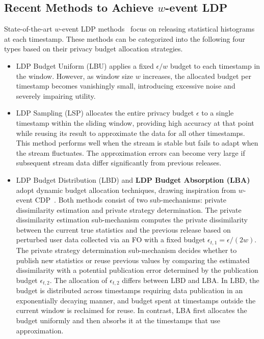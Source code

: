\subsection{\texorpdfstring{Recent Methods to Achieve $w$-event LDP}{Recent Methods to Achieve w-event LDP}}
\label{ss:competitors}

State-of-the-art $w$-event LDP methods~\cite{Ren2022} focus on releasing
statistical histograms at each timestamp.
These methods can be categorized into the following four types based on their
privacy budget allocation strategies.
\begin{itemize}
\item {LDP Budget Uniform (LBU)} applies a fixed $\epsilon/w$ budget to each
timestamp in the window.
However, as window size $w$ increases, the allocated budget per timestamp
becomes vanishingly small, introducing excessive noise and severely impairing
utility.

\item{LDP Sampling (LSP)} allocates the entire privacy budget $\epsilon$ to a
single timestamp within the sliding window, providing high accuracy at that
point while reusing its result to approximate the data for all other timestamps.
This method performs well when the stream is stable but fails to adapt when the
stream fluctuates.
The approximation errors can become very large if subsequent stream data differ
significantly from previous releases.

\item{LDP Budget Distribution (LBD)} and \textbf{LDP Budget Absorption
  (LBA)} adopt dynamic budget allocation techniques, drawing inspiration from
$w$-event CDP~\cite{Kellaris2014}.
Both methods consist of two sub-mechanisms: private dissimilarity estimation and
private strategy determination.
The private dissimilarity estimation sub-mechanism computes the private
dissimilarity between the current true statistics and the previous release based
on perturbed user data collected via an FO with a fixed budget
$\epsilon_{t,1}=\epsilon/(2w)$.
The private strategy determination sub-mechanism decides whether to publish new
statistics or reuse previous values by comparing the estimated dissimilarity
with a potential publication error determined by the publication budget
$\epsilon_{t,2}$.
The allocation of $\epsilon_{t,2}$ differs between LBD and LBA.
In LBD, the budget is distributed across timestamps requiring data publication
in an exponentially decaying manner, and budget spent at timestamps outside the
current window is reclaimed for reuse.
In contrast, LBA first allocates the budget uniformly and then absorbs it at the
timestamps that use approximation.


\end{itemize}
